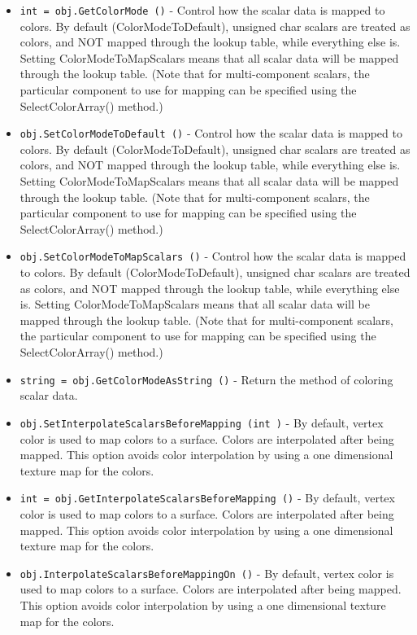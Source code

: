 \begin{itemize}
\item  \verb|int = obj.GetColorMode ()| -  Control how the scalar data is mapped to colors.  By default
 (ColorModeToDefault), unsigned char scalars are treated as colors, and
 NOT mapped through the lookup table, while everything else is. Setting
 ColorModeToMapScalars means that all scalar data will be mapped through
 the lookup table.  (Note that for multi-component scalars, the
 particular component to use for mapping can be specified using the
 SelectColorArray() method.)

\item  \verb|obj.SetColorModeToDefault ()| -  Control how the scalar data is mapped to colors.  By default
 (ColorModeToDefault), unsigned char scalars are treated as colors, and
 NOT mapped through the lookup table, while everything else is. Setting
 ColorModeToMapScalars means that all scalar data will be mapped through
 the lookup table.  (Note that for multi-component scalars, the
 particular component to use for mapping can be specified using the
 SelectColorArray() method.)

\item  \verb|obj.SetColorModeToMapScalars ()| -  Control how the scalar data is mapped to colors.  By default
 (ColorModeToDefault), unsigned char scalars are treated as colors, and
 NOT mapped through the lookup table, while everything else is. Setting
 ColorModeToMapScalars means that all scalar data will be mapped through
 the lookup table.  (Note that for multi-component scalars, the
 particular component to use for mapping can be specified using the
 SelectColorArray() method.)

\item  \verb|string = obj.GetColorModeAsString ()| -  Return the method of coloring scalar data.

\item  \verb|obj.SetInterpolateScalarsBeforeMapping (int )| -  By default, vertex color is used to map colors to a surface.
 Colors are interpolated after being mapped.
 This option avoids color interpolation by using a one dimensional
 texture map for the colors.

\item  \verb|int = obj.GetInterpolateScalarsBeforeMapping ()| -  By default, vertex color is used to map colors to a surface.
 Colors are interpolated after being mapped.
 This option avoids color interpolation by using a one dimensional
 texture map for the colors.

\item  \verb|obj.InterpolateScalarsBeforeMappingOn ()| -  By default, vertex color is used to map colors to a surface.
 Colors are interpolated after being mapped.
 This option avoids color interpolation by using a one dimensional
 texture map for the colors.


\end{itemize}
